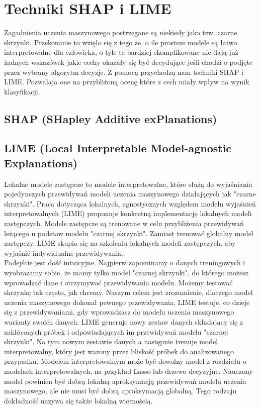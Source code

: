 \section{Techniki SHAP i LIME}
Zagadnienia uczenia maszynowego postrzegane są niekiedy jako tzw. czarne skrzynki. Przekonanie to wzięło się z tego że, o ile prostsze modele są łatwo interpretowalne dla człowieka, o tyle te bardziej skomplikowane nie dają już żadnych wskazówek jakie cechy okazały się być decydujące jeśli chodzi o podjęte przez wybrany algorytm decyzje. Z pomocą przychodzą nam techniki SHAP i LIME. Pozwalaja one na przybliżoną ocenę które z cech miały wpływ na wynik klasyfikacji.\\

\subsection{SHAP (SHapley Additive exPlanations)}

\subsection{LIME (Local Interpretable Model-agnostic Explanations)}

Lokalne modele zastępcze to modele interpretowalne, które służą do wyjaśniania pojedynczych przewidywań modeli uczenia maszynowego działających jak "czarne skrzynki". Praca dotycząca lokalnych, agnostycznych względem modelu wyjaśnień interpretowalnych (LIME) proponuje konkretną implementację lokalnych modeli zastępczych. Modele zastępcze są trenowane w celu przybliżenia przewidywań leżącego u podstaw modelu "czarnej skrzynki". Zamiast trenować globalny model zastępczy, LIME skupia się na szkoleniu lokalnych modeli zastępczych, aby wyjaśnić indywidualne przewidywania.\\

Podejście jest dość intuicyjne. Najpierw zapominamy o danych treningowych i wyobrazamy sobie, że mamy tylko model "czarnej skrzynki", do którego możesz wprowadzać dane i otrzymywać przewidywania modelu. Możemy testować skrzynkę tak często, jak chcemy. Naszym celem jest zrozumienie, dlaczego model uczenia maszynowego dokonał pewnego przewidywania. LIME testuje, co dzieje się z przewidywaniami, gdy wprowadzasz do modelu uczenia maszynowego warianty swoich danych. LIME generuje nowy zestaw danych składający się z zakłóconych próbek i odpowiadających im przewidywań modelu "czarnej skrzynki". Na tym nowym zestawie danych a następnie trenuje model interpretowalny, który jest ważony przez bliskość próbek do analizowanego przypadku. Modelem interpretowalnym może być dowolny model z rozdziału o modelach interpretowalnych, na przykład Lasso lub drzewo decyzyjne. Nauczony model powinien być dobrą lokalną aproksymacją przewidywań modelu uczenia maszynowego, ale nie musi być dobrą aproksymacją globalną. Tego rodzaju dokładność nazywa się także lokalną wiernością.\\

